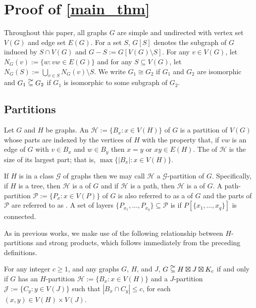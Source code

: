 \documentclass{patmorin}
\newcommand\subsetcong{\mathrel{\text{%
    \setbox0\hbox{$\subseteq$}%
    \rlap{\hbox to \wd0{\hss\hss\hss\raisebox{1.5\height}{$\sim$}\hss}}\box0
}}}
\renewcommand{\le}{\leqslant}
\renewcommand{\ge}{\geqslant}
\begin{document}
\section{Proof of \cref{main_thm}}

Throughout this paper, all graphs $G$ are simple and undirected with vertex set $V(G)$ and edge set $E(G)$.  For a set $S$, $G[S]$ denotes the subgraph of $G$ induced by $S\cap V(G)$ and $G-S:=G[V(G)\setminus S]$.  For any $v\in V(G)$, let $N_G(v):=\{w:vw\in E(G)\}$ and for any $S\subseteq V(G)$, let $N_G(S):=\bigcup_{v\in S} N_G(v)\setminus S$.  We write $G_1\cong G_2$ if $G_1$ and $G_2$ are isomorphic and $G_1\subsetcong G_2$ if $G_1$ is isomorphic to some subgraph of $G_2$.

\subsection{Partitions}

Let $G$ and $H$ be graphs.  An  $\mathcal{H}:=\{B_x:x\in V(H)\}$ of $G$ is a partition of $V(G)$ whose parts are indexed by the vertices of $H$ with the property that, if $vw$ is an edge of $G$ with $v\in B_x$ and $w\in B_y$ then $x=y$ or $xy\in E(H)$.  The  of $\mathcal{H}$ is the size of its largest part; that is, $\max\{|B_x|:x\in V(H)\}$.

If $H$ is in a class $\mathcal{G}$ of graphs then we may call $\mathcal{H}$ a $\mathcal{G}$-partition of $G$.  Specifically, if $H$ is a tree, then $\mathcal{H}$ is a  of $G$ and if $\mathcal{H}$ is a path, then $\mathcal{H}$ is a  of $G$.  A path-partition $\mathcal{P}:=\{P_x:x\in V(P)\}$ of $G$ is also referred to as a  of $G$ and the parts of $\mathcal{P}$ are referred to as .  A set of layers $\{P_{x_1},\ldots,P_{x_q}\}\subseteq\mathcal{P}$ is  if $P[\{x_1,\ldots,x_q\}]$ is connected.

As in previous works, we make use of the following relationship between $H$-partitions and strong products, which follows immediately from the preceding definitions.

\begin{obs}\label{partitions_vs_products}
  For any integer $c\ge 1$, and any graphs $G$, $H$, and $J$,  $G\subsetcong H\boxtimes J\boxtimes K_c$ if and only if $G$ has an $H$-partition $\mathcal{H}:=\{B_x:x\in V(H)\}$ and a $J$-partition $\mathcal{J}:=\{C_y:y\in V(J)\}$ such that $|B_x\cap C_y|\le c$, for each $(x,y)\in V(H)\times V(J)$.
\end{obs}
\end{document}
